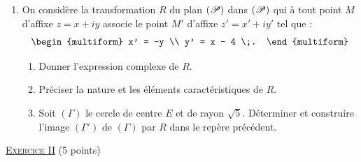\begin{enumerate}
\begin{enumerate}
                  \end{enumerate}
            \item On consid\`ere la transformation $R$ du plan $(\mathscr{P})$ dans $(\mathscr{P})$ qui \`a tout point $M$
                  d'affixe $z = x + iy$ associe le point $M'$ d'affixe $z' = x' + i y'$ tel que : 
                        $$ \begin{multiform} x' = -y \\ y' = x - 4 \;. \end{multiform} $$
                  \begin{enumerate}
                        \item Donner l'expression complexe de $R$.
                        \item Pr\'eciser la nature et les \'el\'ements caract\'eristiques de $R$.
                        \item Soit $(\Gamma)$ le cercle de centre $E$ et de rayon $\sqrt{5}$.
                              D\'eterminer et construire l'image $(\Gamma ')$ de $(\Gamma)$ par $R$ 
                              dans le rep\`ere pr\'ec\'edent.
                  \end{enumerate}
      \end{enumerate}
\noindent \underline{\textsc{Exercice II}} (5 points) 
